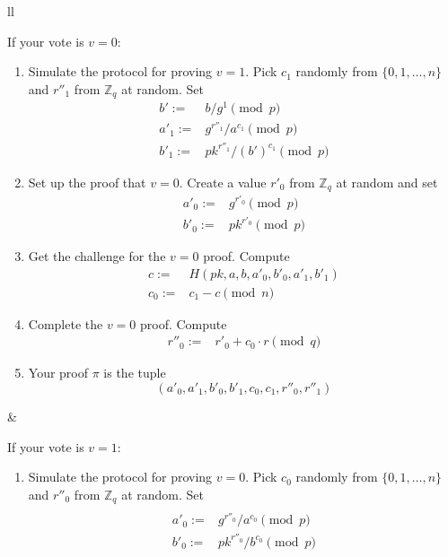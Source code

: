 \documentclass{llncs}
\begin{document}
\begin{center}
\begin{tabular}{ll}
\begin{minipage}{0.45\textwidth}
If your vote is $v = 0$:

\noindent\begin{enumerate}
\item Simulate the protocol for proving $v = 1$.
Pick $c_1$ randomly from $\{0, 1, \ldots, n\}$ and $r''_1$ from $\mathbb Z_q$ at
random.
Set \[ \begin{array}{rl}
b' := & b/g^1 \pmod{p} \\
a'_1 := & g^{r''_1}/a^{c_1} \pmod{p} \\
b'_1 := & pk^{r''_1}/(b')^{c_1} \pmod{p}
\end{array} \]

\item Set up the proof that $v = 0$.
Create a value $r'_0$ from $\mathbb Z_q$ at random and set
\[ \begin{array}{rl}
a'_0 := & g^{r'_0} \pmod{p} \\
b'_0 := & pk^{r'_0} \pmod{p}
\end{array} \]

\item Get the challenge for the $v = 0$ proof.
Compute
\[ \begin{array}{rl}
c := & H(pk, a, b, a'_0, b'_0, a'_1, b'_1) \\
c_0 := & c_1 - c \pmod{n}
\end{array} \]

\item Complete the $v = 0$ proof.
Compute
\[ \begin{array}{rl}
r''_0 := & r'_0 + c_0 \cdot r \pmod{q}
\end{array} \]

\item Your proof $\pi$ is the tuple
\[
(a'_0, a'_1, b'_0, b'_1, c_0, c_1, r''_0, r''_1)
\]
\end{enumerate}
\end{minipage}
\quad & \quad
\begin{minipage}{0.45\textwidth}
If your vote is $v = 1$:

\begin{enumerate}
\item Simulate the protocol for proving $v = 0$.
Pick $c_0$ randomly from $\{0, 1, \ldots, n\}$ and $r''_0$ from $\mathbb Z_q$ at
random.
Set \[ \begin{array}{rl}
\\
a'_0 := & g^{r''_0}/a^{c_0} \pmod{p} \\
b'_0 := & pk^{r''_0}/b^{c_0} \pmod{p}
\end{array} \]


\end{enumerate}
\end{minipage}
\end{tabular}
\end{center}
\end{document}
